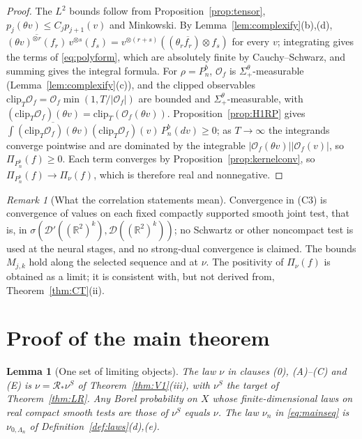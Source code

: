 \documentclass[11pt]{article}
\theoremstyle{plain}
\newtheorem{lemma}[theorem]{Lemma}
\theoremstyle{definition}
\theoremstyle{remark}
\newtheorem{remark}[theorem]{Remark}
\newcommand{\R}{\mathbb{R}}
\newcommand{\cD}{\mathcal{D}}
\newcommand{\cO}{\mathcal{O}}
\newcommand{\clip}{\mathrm{clip}}
\newcommand{\conj}[1]{\overline{#1}}
\begin{document}
\begin{proof}
The $L^{2}$ bounds follow from Proposition~\ref{prop:tensor},
$p_j(\theta v)\le C_jp_{j+1}(v)$ and Minkowski. By Lemma~\ref{lem:complexify}(b),(d),
$\conj{(\theta v)^{\otimes r}(f_r)}\,v^{\otimes s}(f_s)=v^{\otimes(r+s)}((\theta_r\conj{f_r})\otimes f_s)$ for every $v$;
integrating gives the terms of \eqref{eq:polyform}, which are absolutely finite by
Cauchy--Schwarz, and summing gives the integral formula. For $\rho=P^{b}_{n}$, $\cO_f$ is
$\Sigma^{\theta}_{+}$-measurable (Lemma~\ref{lem:complexify}(c)), and the clipped observables
$\clip_T\cO_f=\cO_f\min(1,T/|\cO_f|)$ are bounded and $\Sigma^{\theta}_{+}$-measurable, with
$(\clip_T\cO_f)(\theta v)=\clip_T(\cO_f(\theta v))$. Proposition~\ref{prop:H1RP} gives
$\int\conj{(\clip_T\cO_f)(\theta v)}(\clip_T\cO_f)(v)\,P^{b}_{n}(dv)\ge0$; as $T\to\infty$ the integrands
converge pointwise and are dominated by the integrable $|\cO_f(\theta v)||\cO_f(v)|$, so
$\Pi_{P^{b}_{n}}(f)\ge0$. Each term converges by Proposition~\ref{prop:kernelconv}, so
$\Pi_{P^{b}_{n}}(f)\to\Pi_\nu(f)$, which is therefore real and nonnegative.
\end{proof}

\begin{remark}[What the correlation statements mean]\label{rem:K1-scope}
Convergence in (C3) is convergence of values on each fixed compactly supported
smooth joint test, that is, in $\sigma(\cD'((\R^{2})^{k}),\cD((\R^{2})^{k}))$; no Schwartz or other
noncompact test is used at the neural stages, and no strong-dual convergence is
claimed. The bounds $M_{j,k}$ hold along the selected sequence and at $\nu$. The
positivity of $\Pi_\nu(f)$ is obtained as a limit; it is consistent with, but not
derived from, Theorem~\ref{thm:CT}(ii).
\end{remark}

\section{Proof of the main theorem}\label{sec:proof}

\begin{lemma}[One set of limiting objects]\label{lem:identity}
The law $\nu$ in clauses (0), (A)--(C) and (E) is $\nu=\mathcal R_*\nu^{S}$ of
Theorem~\ref{thm:V1}(iii), with $\nu^{S}$ the target of Theorem~\ref{thm:LR}. Any Borel
probability on $X$ whose finite-dimensional laws on real compact smooth tests are
those of $\nu^{S}$ equals $\nu$. The law $\nu_n$ in \eqref{eq:mainseq} is $\nu_{0,\Lambda_n}$ of
Definition~\ref{def:laws}(d),(e).
\end{lemma}
\end{document}
